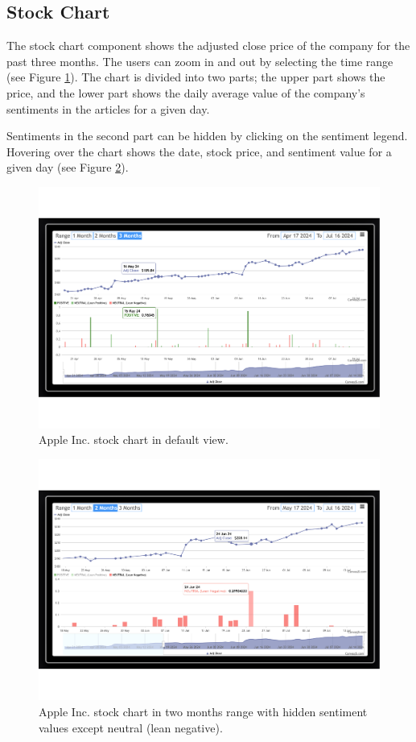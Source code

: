 \subsection{Stock Chart}
\label{subsec:stock-chart}
The stock chart component shows the adjusted close price of the company for the past three months. The users can zoom in and out by selecting the time range (see Figure \ref{fig:apple-stock}). The chart is divided into two parts; the upper part shows the price, and the lower part shows the daily average value of the company's sentiments in the articles for a given day.

Sentiments in the second part can be hidden by clicking on the sentiment legend. Hovering over the chart shows the date, stock price, and sentiment value for a given day (see Figure \ref{fig:apple-stock-range-neutral}).

\begin{figure}[htbp]
    \centering
    \includegraphics[width=\textwidth]{img/user/apple-stock-a.pdf}
    \caption{Apple Inc. stock chart in default view.}
    \label{fig:apple-stock}
\end{figure}

\begin{figure}[htbp]
    \centering
    \includegraphics[width=\textwidth]{img/user/apple-stock-range-neutral-a.pdf}
    \caption{Apple Inc. stock chart in two months range with hidden sentiment values except neutral (lean negative).}
    \label{fig:apple-stock-range-neutral}
\end{figure}


